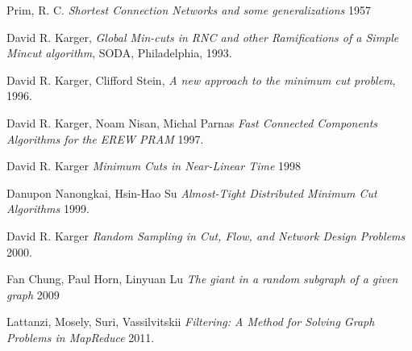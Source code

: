 \documentclass{article}
\begin{document}
\begin{thebibliography}{9}

  Prim, R. C.
  \emph{Shortest Connection Networks and some generalizations}
  1957

  David R. Karger,
  \emph{Global Min-cuts in RNC and other Ramifications of a Simple Mincut algorithm},
  SODA, Philadelphia,
  1993.

  David R. Karger, Clifford Stein,
  \emph{A new approach to the minimum cut problem},
  1996.

  David R. Karger, Noam Nisan, Michal Parnas
  \emph{Fast Connected Components Algorithms for the EREW PRAM}
  1997.

  David R. Karger
  \emph{Minimum Cuts in Near-Linear Time}
  1998

  Danupon Nanongkai, Hsin-Hao Su
  \emph{Almost-Tight Distributed Minimum Cut Algorithms}
  1999.

  David R. Karger
  \emph{Random Sampling in Cut, Flow, and Network Design Problems}
  2000.

  Fan Chung, Paul Horn, Linyuan Lu
  \emph{The giant in a random subgraph of a given graph}
  2009

  Lattanzi, Mosely, Suri, Vassilvitskii
  \emph{Filtering: A Method for Solving Graph Problems in MapReduce}
  2011.

\end{thebibliography}
\end{document}
